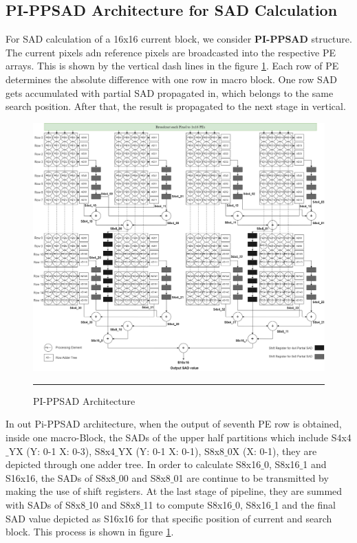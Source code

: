 \subsection{PI-PPSAD Architecture for SAD Calculation}

For SAD calculation of a 16x16 current block, we consider \textbf{PI-PPSAD} structure. The current pixels adn reference pixels are broadcasted into the respective PE arrays. This is shown by the vertical dash lines in the figure \ref{fig:pippsad}. Each row of PE determines the absolute difference with one row in macro block. One row SAD gets accumulated with partial SAD propagated in, which belongs to the same search position. After that, the result is propagated to the next stage in vertical.

\begin{figure}[H]
	\centering
	\includegraphics[width = 5.5in]{./Figures/PIPPSAD.png}
	\rule{35em}{0.5pt}
	\caption{PI-PPSAD Architecture}
	\label{fig:pippsad}
\end{figure}

In out Pi-PPSAD architecture, when the output of seventh PE row is obtained, inside one macro-Block, the SADs of the upper half partitions which include S4x4$\_$YX (Y: 0-1 X: 0-3), S8x4$\_$YX (Y: 0-1 X: 0-1), S8x8$\_$0X (X: 0-1), they are depicted through one adder tree. In order to calculate S8x16$\_$0, S8x16$\_$1 and S16x16, the SADs of S8x8$\_$00 and S8x8$\_$01 are continue to be transmitted by making the use of shift registers. At the last stage of pipeline, they are summed with SADs of S8x8$\_$10 and S8x8$\_$11 to compute S8x16$\_$0, S8x16$\_$1 and the final SAD value depicted as S16x16 for that specific position of current and search block. This process is shown in figure \ref{fig:pippsad}.

